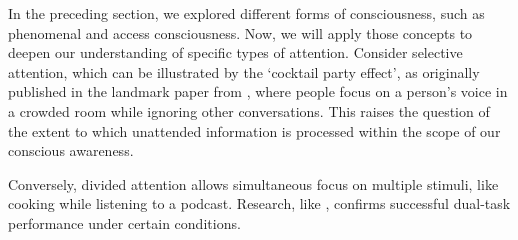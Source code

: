 \documentclass[10pt]{article}
\begin{document}
\begin{sloppypar}
  In the preceding section, we explored different forms of consciousness, such as phenomenal and access consciousness. Now, we will apply those concepts to deepen our understanding of specific types of attention. Consider selective attention, which can be illustrated by the ‘cocktail party effect’, as originally published in the landmark paper from \cite{cherry_experiments_1953}, where people focus on a person’s voice in a crowded room while ignoring other conversations. This raises the question of the extent to which unattended information is processed within the scope of our conscious awareness.

  Conversely, divided attention allows simultaneous focus on multiple stimuli, like cooking while listening to a podcast. Research, like \cite{rodrigue_spatio-temporal_2015}, confirms successful dual-task performance under certain conditions.

  \vspace{10pt} %
  \begin{table}[ht]
    \centering
    \renewcommand{\arraystretch}{1.5}
    \setlength{\tabcolsep}{12pt}
    \caption{Two major types of attention and their descriptions.}
    \label{tab:overview-attention}
  \end{table}


\end{sloppypar}
\end{document}
